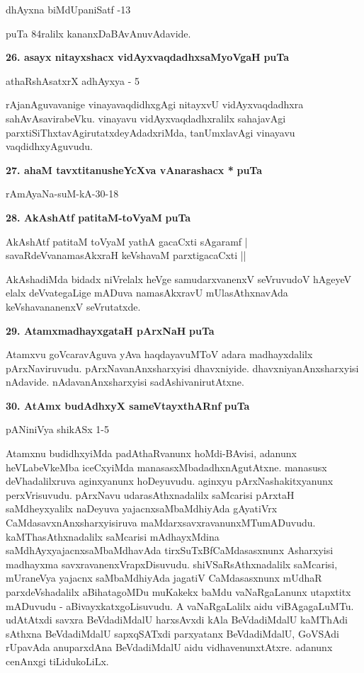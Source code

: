 \hfill{dhAyxna biMdUpaniSatf -13}

puTa 84ralilx kananxDaBAvAnuvAdavide.

\eject

\noindent
\textbf{26. asayx nitayxshacx vidAyxvaqdadhxsaMyoVgaH} \hfill{\bf puTa \pageref{93a}}

\hfill{athaRshAsatxrX adhAyxya - 5}

\smallskip
rAjanAguvavanige vinayavaqdidhxgAgi nitayxvU vidAyxvaqdadhxra sahAvAsavirabeVku. vinayavu vidAyxvaqdadhxralilx sahajavAgi parxtiSiThxtavAgirutatxdeyAdadxriMda, tanUmxlavAgi vinayavu vaqdidhxyAguvudu.

\medskip
\noindent
\textbf{27. ahaM tavxtitanusheYcXva vAnarashacx *} \hfill{\bf puTa \pageref{14}}

\hfill{rAmAyaNa-suM-kA-30-18}

\medskip
\noindent
\textbf{28. AkAshAtf patitaM-toVyaM} \hfill{\bf puTa \pageref{247}}

\begin{shloka}
AkAshAtf patitaM toVyaM yathA gacaCxti sAgaramf |\\
savaRdeVvanamasAkxraH keVshavaM parxtigacaCxti ||
\end{shloka}

AkAshadiMda bidadx niVrelalx heVge samudarxvanenxV seVruvudoV hAgeyeV elalx deVvategaLige mADuva namasAkxravU mUlasAthxnavAda keVshavananenxV seVrutatxde.

\smallskip
\noindent
\textbf{29. AtamxmadhayxgataH pArxNaH} \hfill{\bf puTa \pageref{152a}}

Atamxvu goVcaravAguva yAva haqdayavuMToV adara madhayxdalilx pArxNaviruvudu. pArxNavanAnxsharxyisi dhavxniyide. dhavxniyanAnxsharxyisi nAdavide. nAdavanAnxsharxyisi sadAshivanirutAtxne. 

\medskip
\noindent
\textbf{30. AtAmx budAdhxyX sameVtayxthARnf} \hfill{\bf puTa \pageref{152g}}

\hfill{pANiniVya shikASx 1-5}

\smallskip
Atamxnu budidhxyiMda padAthaRvanunx hoMdi-BAvisi, adanunx heVLabeVkeMba iceCxyiMda manasasxMbadadhxnAgutAtxne. manasusx deVhadalilxruva aginxyanunx hoDeyuvudu. aginxyu pArxNashakitxyanunx perxVrisuvudu. pArxNavu udarasAthxnadalilx saMcarisi pArxtaH saMdheyxyalilx naDeyuva yajacnxsaMbaMdhiyAda gAyatiVrx CaMdasavxnAnxsharxyisiruva maMdarxsavxravanunxMTumADuvudu. kaMThasAthxnadalilx saMcarisi mAdhayxMdina saMdhAyxyajacnxsaMbaMdhavAda tirxSuTxBfCaMdasasxnunx Asharxyisi madhayxma savxravanenxVrapxDisuvudu. shiVSaRsAthxnadalilx saMcarisi, mUraneVya yajacnx saMbaMdhiyAda jagatiV CaMdasasxnunx mUdhaR parxdeVshadalilx aBihatagoMDu muKakekx baMdu vaNaRgaLanunx utapxtitx mADuvudu - aBivayxkatxgoLisuvudu. A vaNaRgaLalilx aidu viBAgagaLuMTu. udAtAtxdi savxra BeVdadiMdalU harxsAvxdi kAla BeVdadiMdalU kaMThAdi sAthxna BeVdadiMdalU sapxqSATxdi parxyatanx BeVdadiMdalU, GoVSAdi rUpavAda anuparxdAna BeVdadiMdalU aidu vidhavenunxtAtxre. adanunx cenAnxgi tiLidukoLiLx.

